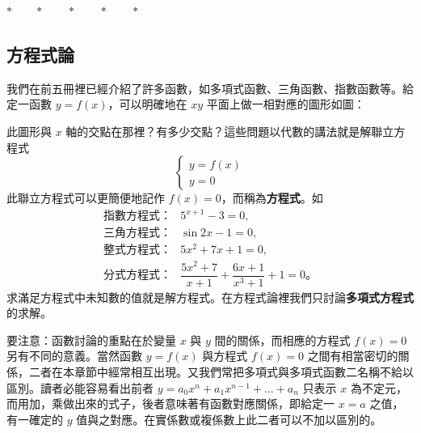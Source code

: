 \begin{center}
$* \qquad * \qquad * \qquad * \qquad *$
\end{center}

\subsection{方程式論}\label{sec:b6s-2-1}

我們在前五冊裡已經介紹了許多函數，如多項式函數、三角函數、指數函數等。給定一函數 $y=f(x)$，可以明確地在 $xy$ 平面上做一相對應的圖形如圖：

\begin{figure}[H]
\centering
{}
\end{figure}

此圖形與 $x$ 軸的交點在那裡？有多少交點？這些問題以代數的講法就是解聯立方程式
\[ \begin{cases} y = f(x) \\ y = 0 \end{cases} \]
此聯立方程式可以更簡便地記作 $f(x)=0$，而稱為\textbf{方程式}。如
\begin{align*}
\text{指數方程式：}& 5^{x+1} - 3 = 0, \\
\text{三角方程式：}& \sin 2x - 1 = 0, \\
\text{整式方程式：}& 5x^2 + 7x + 1 = 0, \\
\text{分式方程式：}& \dfrac{5x^2+7}{x+1} + \dfrac{6x+1}{x^3+1} + 1 = 0 \text{。}
\end{align*}
求滿足方程式中未知數的值就是解方程式。在方程式論裡我們只討論\textbf{多項式方程式}的求解。

要注意：函數討論的重點在於變量 $x$ 與 $y$ 間的關係，而相應的方程式 $f(x)=0$ 另有不同的意義。當然函數 $y=f(x)$ 與方程式 $f(x)=0$ 之間有相當密切的關係，二者在本章節中經常相互出現。又我們常把多項式與多項式函數二名稱不給以區別。讀者必能容易看出前者 $y=a_0 x^n + a_1 x^{n-1} + \dots + a_n$ 只表示 $x$ 為不定元，而用加，乘做出來的式子，後者意味著有函數對應關係，即給定一 $x=a$ 之值，有一確定的 $y$ 值與之對應。在實係數或複係數上此二者可以不加以區別的。

